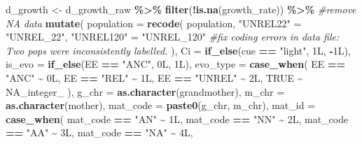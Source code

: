 \documentclass[
]{article}
\newenvironment{Shaded}{\begin{snugshade}}{\end{snugshade}}
\newcommand{\AttributeTok}[1]{\textcolor[rgb]{0.13,0.29,0.53}{#1}}
\newcommand{\CommentTok}[1]{\textcolor[rgb]{0.56,0.35,0.01}{\textit{#1}}}
\newcommand{\ConstantTok}[1]{\textcolor[rgb]{0.56,0.35,0.01}{#1}}
\newcommand{\DataTypeTok}[1]{\textcolor[rgb]{0.13,0.29,0.53}{#1}}
\newcommand{\DecValTok}[1]{\textcolor[rgb]{0.00,0.00,0.81}{#1}}
\newcommand{\FunctionTok}[1]{\textcolor[rgb]{0.13,0.29,0.53}{\textbf{#1}}}
\newcommand{\NormalTok}[1]{#1}
\newcommand{\OtherTok}[1]{\textcolor[rgb]{0.56,0.35,0.01}{#1}}
\newcommand{\SpecialCharTok}[1]{\textcolor[rgb]{0.81,0.36,0.00}{\textbf{#1}}}
\newcommand{\StringTok}[1]{\textcolor[rgb]{0.31,0.60,0.02}{#1}}
\begin{document}
\begin{Shaded}
\begin{Highlighting}[]
\NormalTok{d\_growth }\OtherTok{\textless{}{-}}\NormalTok{ d\_growth\_raw }\SpecialCharTok{\%\textgreater{}\%}
  \FunctionTok{filter}\NormalTok{(}\SpecialCharTok{!}\FunctionTok{is.na}\NormalTok{(growth\_rate)) }\SpecialCharTok{\%\textgreater{}\%} \CommentTok{\#remove NA data}
  \FunctionTok{mutate}\NormalTok{(}
    \AttributeTok{population =} \FunctionTok{recode}\NormalTok{(}
\NormalTok{      population,}
      \StringTok{"UNREL22"}  \OtherTok{=} \StringTok{"UNREL\_22"}\NormalTok{,}
      \StringTok{"UNREL120"} \OtherTok{=} \StringTok{"UNREL\_120"} \CommentTok{\#fix coding errors in data file: Two pops were inconsistently labelled.}
\NormalTok{    ),}
    \AttributeTok{Ci =} \FunctionTok{if\_else}\NormalTok{(cue }\SpecialCharTok{==} \StringTok{"light"}\NormalTok{, }\DecValTok{1}\DataTypeTok{L}\NormalTok{, }\SpecialCharTok{{-}}\DecValTok{1}\DataTypeTok{L}\NormalTok{),}
    \AttributeTok{is\_evo =} \FunctionTok{if\_else}\NormalTok{(EE }\SpecialCharTok{==} \StringTok{"ANC"}\NormalTok{, }\DecValTok{0}\DataTypeTok{L}\NormalTok{, }\DecValTok{1}\DataTypeTok{L}\NormalTok{),}
    \AttributeTok{evo\_type =} \FunctionTok{case\_when}\NormalTok{(}
\NormalTok{      EE }\SpecialCharTok{==} \StringTok{"ANC"}   \SpecialCharTok{\textasciitilde{}} \DecValTok{0}\DataTypeTok{L}\NormalTok{,}
\NormalTok{      EE }\SpecialCharTok{==} \StringTok{"REL"}   \SpecialCharTok{\textasciitilde{}} \DecValTok{1}\DataTypeTok{L}\NormalTok{,}
\NormalTok{      EE }\SpecialCharTok{==} \StringTok{"UNREL"} \SpecialCharTok{\textasciitilde{}} \DecValTok{2}\DataTypeTok{L}\NormalTok{,}
      \ConstantTok{TRUE}          \SpecialCharTok{\textasciitilde{}} \ConstantTok{NA\_integer\_}
\NormalTok{    ),}
    \AttributeTok{g\_chr =} \FunctionTok{as.character}\NormalTok{(grandmother),}
    \AttributeTok{m\_chr =} \FunctionTok{as.character}\NormalTok{(mother),}
    \AttributeTok{mat\_code =} \FunctionTok{paste0}\NormalTok{(g\_chr, m\_chr),}
    \AttributeTok{mat\_id =} \FunctionTok{case\_when}\NormalTok{(}
\NormalTok{      mat\_code }\SpecialCharTok{==} \StringTok{"AN"} \SpecialCharTok{\textasciitilde{}} \DecValTok{1}\DataTypeTok{L}\NormalTok{,}
\NormalTok{      mat\_code }\SpecialCharTok{==} \StringTok{"NN"} \SpecialCharTok{\textasciitilde{}} \DecValTok{2}\DataTypeTok{L}\NormalTok{,}
\NormalTok{      mat\_code }\SpecialCharTok{==} \StringTok{"AA"} \SpecialCharTok{\textasciitilde{}} \DecValTok{3}\DataTypeTok{L}\NormalTok{,}
\NormalTok{      mat\_code }\SpecialCharTok{==} \StringTok{"NA"} \SpecialCharTok{\textasciitilde{}} \DecValTok{4}\DataTypeTok{L}\NormalTok{,}

\end{Highlighting}
\end{Shaded}
\end{document}
